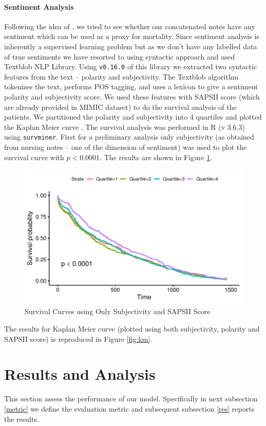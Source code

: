 \documentclass[11pt,a4paper]{article}
\begin{document}
\paragraph{Sentiment Analysis} Following the idea of \citet{Smith18}, we tried to see whether our concatenated notes have any sentiment which can be used as a proxy for mortality. Since sentiment analysis is inherently a supervised learning problem but as we don't have any labelled data of true sentiments we have resorted to using syntactic approach and used Textblob NLP Library. Using \texttt{v0.16.0} of this library we extracted two syntactic features from the text -- polarity and subjectivity.
The Textblob algorithm tokenizes the text, performs POS tagging, and uses a lexicon to give a sentiment polarity and subjectivity score. 
We used these features with SAPSII score (which are already provided in MIMIC dataset) to do the survival analysis of the patients. We partitioned the polarity and subjectivity into 4 quartiles and plotted the Kaplan Meier curve \cite{kaplan1958nonparametric}. The survival analysis was performed in  R (v 3.6.3) using \texttt{survminer}.
First for a preliminary analysis only subjectivity (as obtained from nursing notes -- one of the dimension of sentiment) was used to plot the survival curve with $p<0.0001$. The results are shown in Figure \ref{fig:surv1}.
\begin{figure}[h!]
	\centering
	\includegraphics[width=0.7\linewidth]{surv1}
	\caption{Survival Curves using Only Subjectivity and SAPSII Score}
	\label{fig:surv1}
\end{figure}
The results for Kaplan Meier curve (plotted using both subjectivity, polarity and SAPSII score) is reproduced in Figure \ref{fig:km}.   
\section{Results and Analysis}\label{evaluation}
This section assess the performance of our model. Specifically in next subsection \ref{metric} we define the evaluation metric and subsequent subsection \ref{res} reports the results. 
\end{document}
